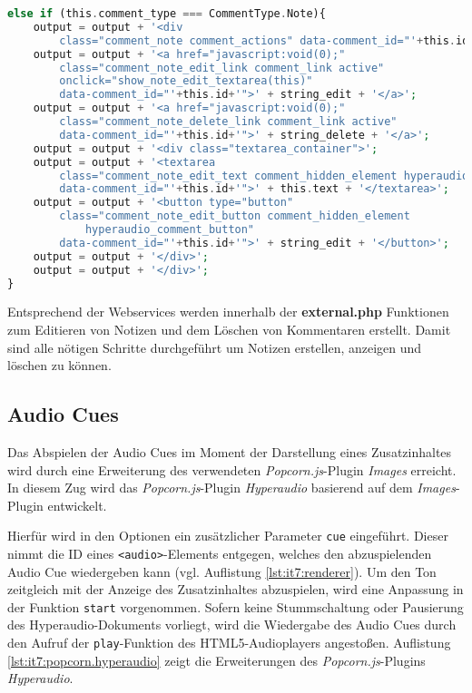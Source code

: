  
\begin{lstlisting}[language=php,
             linewidth=\textwidth,
             caption={Ausschnitt der \textbf{hyperaudio.js} in der 6. Iteration},
             label={lst:it6:hyperaudio}]
else if (this.comment_type === CommentType.Note){
    output = output + '<div
        class="comment_note comment_actions" data-comment_id="'+this.id+'">';
    output = output + '<a href="javascript:void(0);"
        class="comment_note_edit_link comment_link active"
        onclick="show_note_edit_textarea(this)"
        data-comment_id="'+this.id+'">' + string_edit + '</a>';
    output = output + '<a href="javascript:void(0);"
        class="comment_note_delete_link comment_link active"
        data-comment_id="'+this.id+'">' + string_delete + '</a>';
    output = output + '<div class="textarea_container">';
    output = output + '<textarea
        class="comment_note_edit_text comment_hidden_element hyperaudio_textarea"
        data-comment_id="'+this.id+'">' + this.text + '</textarea>';
    output = output + '<button type="button"
        class="comment_note_edit_button comment_hidden_element
            hyperaudio_comment_button"
        data-comment_id="'+this.id+'">' + string_edit + '</button>';
    output = output + '</div>';
    output = output + '</div>';
}		
\end{lstlisting}

Entsprechend der Webservices werden innerhalb der \textbf{external.php} Funktionen zum Editieren von Notizen und dem Löschen von Kommentaren erstellt. Damit sind alle nötigen Schritte durchgeführt um Notizen erstellen, anzeigen und löschen zu können.


\subsection{Audio Cues}
Das Abspielen der Audio Cues im Moment der Darstellung eines Zusatzinhaltes wird durch eine Erweiterung des verwendeten \textit{Popcorn.js}-Plugin \textit{Images} erreicht. In diesem Zug wird das \textit{Popcorn.js}-Plugin \textit{Hyperaudio} basierend auf dem \textit{Images}-Plugin entwickelt.

Hierfür wird in den Optionen ein zusätzlicher Parameter \texttt{cue} eingeführt. Dieser nimmt die ID eines \texttt{<audio>}-Elements entgegen, welches den abzuspielenden Audio Cue wiedergeben kann (vgl. Auflistung \ref{lst:it7:renderer}). Um den Ton zeitgleich mit der Anzeige des Zusatzinhaltes abzuspielen, wird eine Anpassung in der Funktion \texttt{start} vorgenommen. Sofern keine Stummschaltung oder Pausierung des Hyperaudio-Dokuments vorliegt, wird die Wiedergabe des Audio Cues durch den Aufruf der \texttt{play}-Funktion des HTML5-Audioplayers angestoßen. Auflistung \ref{lst:it7:popcorn.hyperaudio} zeigt die Erweiterungen des \textit{Popcorn.js}-Plugins \textit{Hyperaudio}.

